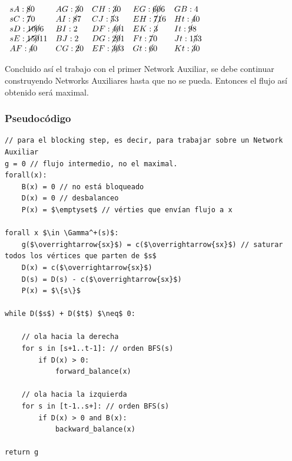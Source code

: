\documentclass[10pt,a4paper]{article}
\begin{document}
\begin{center}
$\begin{array}{lllll} sA:\cancel{8} 0 & AG: \cancel{3}0 & CH: \cancel{3}0 & EG: \cancel{6}\cancel{0}6 & GB:4\\ sC:\cancel{7 } 0 & AI: \cancel{8}7 & CJ: \cancel{5}3 & EH: \cancel{7}\cancel{1}6 & Ht: \cancel{4}0\\ sD:\cancel{10} \cancel{0}6 & BI: 2 & DF:\cancel{4}\cancel{0}1 & EK: \cancel{3} & It: \cancel{9}8\\ sE: \cancel{15} \cancel{0}11 &BJ: 2 & DG: \cancel{2}\cancel{0}1 & Ft: \cancel{7}0 & Jt: 1\cancel{5}3\\ AF: \cancel{4}0 & CG: \cancel{2}0 & EF: \cancel{3}\cancel{0}3 & Gt: \cancel{6}0 & Kt: \cancel{3}0\\ \end{array}$
\end{center}

Concluido así el trabajo con el primer Network Auxiliar, se debe continuar construyendo Networks Auxiliares hasta que no se pueda. Entonces el flujo así obtenido será maximal.

\subsubsection*{Pseudocódigo}


    \begin{lstlisting}[language=pseudo]
// para el blocking step, es decir, para trabajar sobre un Network Auxiliar
g = 0 // flujo intermedio, no el maximal.
forall(x):
    B(x) = 0 // no está bloqueado
    D(x) = 0 // desbalanceo
    P(x) = $\emptyset$ // vérties que envían flujo a x

forall x $\in \Gamma^+(s)$:
    g($\overrightarrow{sx}$) = c($\overrightarrow{sx}$) // saturar todos los vértices que parten de $s$
    D(x) = c($\overrightarrow{sx}$)
    D(s) = D(s) - c($\overrightarrow{sx}$)
    P(x) = $\{s\}$

while D($s$) + D($t$) $\neq$ 0:

    // ola hacia la derecha
    for s in [s+1..t-1]: // orden BFS(s)
        if D(x) > 0:
            forward_balance(x)

    // ola hacia la izquierda
    for s in [t-1..s+]: // orden BFS(s)
        if D(x) > 0 and B(x):
            backward_balance(x)

return g
\end{lstlisting}
\end{document}
